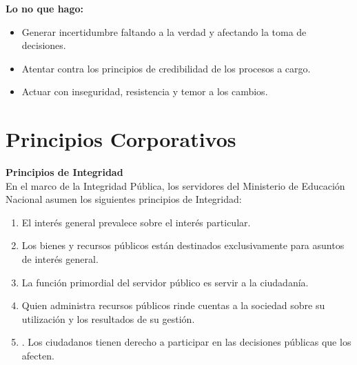 \textbf{Lo no que hago: }
\begin{itemize}
	\item Generar incertidumbre faltando a la verdad y afectando la toma de decisiones. 
	\item Atentar contra los principios de credibilidad de los procesos a cargo. 
	\item Actuar con inseguridad, resistencia y temor a los cambios.
\end{itemize}

\section{Principios Corporativos}

\textbf{Principios de Integridad} \\
En el marco de la Integridad Pública, los servidores del Ministerio de Educación Nacional asumen los siguientes principios de Integridad: 

\begin{enumerate}
	\item El interés general prevalece sobre el interés particular. 
	\item Los bienes y recursos públicos están destinados exclusivamente para asuntos de interés general. 
	\item  La función primordial del servidor público es servir a la ciudadanía. 
	\item Quien administra recursos públicos rinde cuentas a la sociedad sobre su utilización y los resultados de su gestión.
	\item . Los ciudadanos tienen derecho a participar en las decisiones públicas que los afecten.
\end{enumerate}
